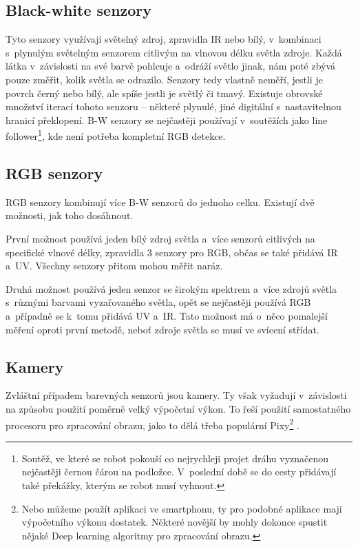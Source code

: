 \subsection{Black-white senzory}
Tyto senzory využívají světelný zdroj, zpravidla IR nebo bílý, v~kombinaci s~plynulým světelným senzorem citlivým na vlnovou délku světla zdroje.
Každá látka v~závislosti na své barvě pohlcuje a~odráží světlo jinak, nám poté zbývá pouze změřit, kolik světla se odrazilo.
Senzory tedy vlastně neměří, jestli je povrch černý nebo bílý, ale spíše jestli je světlý či tmavý.
Existuje obrovské množství iterací tohoto senzoru -- některé plynulé, jiné digitální s~nastavitelnou hranicí překlopení.
B-W senzory se nejčastěji používají v~soutěžích jako line follower\footnote{Soutěž, ve které se robot pokouší co nejrychleji projet dráhu vyznačenou nejčastěji černou čárou na podložce. V~poslední době se do cesty přidávají také překážky, kterým se robot musí vyhnout.}, kde není potřeba kompletní RGB detekce.

\subsection{RGB senzory}
RGB senzory kombinují více B-W senzorů do jednoho celku.
Existují dvě možnosti, jak toho dosáhnout. 

První možnost používá jeden bílý zdroj světla a~více senzorů citlivých na specifické vlnové délky, zpravidla 3 senzory pro RGB, občas se také přidává IR a~UV.
Všechny senzory přitom mohou měřit naráz.

Druhá možnost používá jeden senzor se širokým spektrem a~více zdrojů světla s~různými barvami vyzařovaného světla, opět se nejčastěji používá RGB a~případně se k~tomu přidává UV a~IR.
Tato možnost má o~něco pomalejší měření oproti první metodě, neboť zdroje světla se musí ve svícení střídat.

\subsection{Kamery}
Zvláštní případem barevných senzorů jsou kamery.
Ty však vyžadují v~závislosti na způsobu použití poměrně velký výpočetní výkon.
To řeší použití samostatného procesoru pro zpracování obrazu, jako to dělá třeba populární Pixy\footnote{Nebo můžeme použít aplikaci ve smartphonu, ty pro podobné aplikace mají výpočetního výkonu dostatek. Některé novější by mohly dokonce spustit nějaké Deep learning algoritmy pro zpracování obrazu.} \cite{pixy}.


